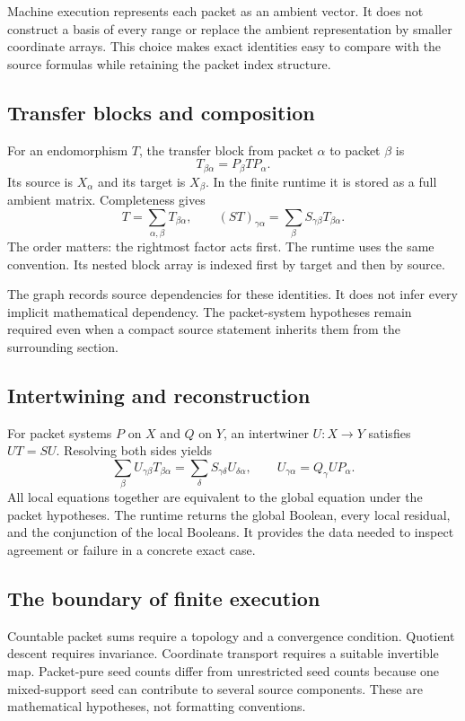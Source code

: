 \documentclass[a4paper,11pt]{article}
\begin{document}
Machine execution represents each packet as an ambient vector. It does not construct a basis of every range or replace the ambient representation by smaller coordinate arrays. This choice makes exact identities easy to compare with the source formulas while retaining the packet index structure.
\subsection{Transfer blocks and composition}
For an endomorphism $T$, the transfer block from packet $\alpha$ to packet $\beta$ is
\[
T_{\beta\alpha}=P_\beta TP_\alpha.
\]
Its source is $X_\alpha$ and its target is $X_\beta$. In the finite runtime it is stored as a full ambient matrix. Completeness gives
\[
T=\sum_{\alpha,\beta}T_{\beta\alpha},\qquad
(ST)_{\gamma\alpha}=\sum_\beta S_{\gamma\beta}T_{\beta\alpha}.
\]
The order matters: the rightmost factor acts first. The runtime uses the same convention. Its nested block array is indexed first by target and then by source.

The graph records source dependencies for these identities. It does not infer every implicit mathematical dependency. The packet-system hypotheses remain required even when a compact source statement inherits them from the surrounding section.
\subsection{Intertwining and reconstruction}
For packet systems $P$ on $X$ and $Q$ on $Y$, an intertwiner $U:X\to Y$ satisfies $UT=SU$. Resolving both sides yields
\[
\sum_\beta U_{\gamma\beta}T_{\beta\alpha}
=
\sum_\delta S_{\gamma\delta}U_{\delta\alpha},
\qquad U_{\gamma\alpha}=Q_\gamma UP_\alpha.
\]
All local equations together are equivalent to the global equation under the packet hypotheses. The runtime returns the global Boolean, every local residual, and the conjunction of the local Booleans. It provides the data needed to inspect agreement or failure in a concrete exact case.
\subsection{The boundary of finite execution}
Countable packet sums require a topology and a convergence condition. Quotient descent requires invariance. Coordinate transport requires a suitable invertible map. Packet-pure seed counts differ from unrestricted seed counts because one mixed-support seed can contribute to several source components. These are mathematical hypotheses, not formatting conventions.
\end{document}

